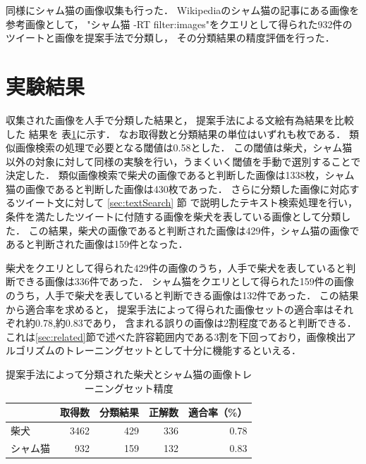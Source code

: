 同様にシャム猫の画像収集も行った．
Wikipediaのシャム猫の記事にある画像を参考画像として，
"シャム猫 -RT filter:images"をクエリとして得られた932件のツイートと画像を提案手法で分類し，
その分類結果の精度評価を行った．

\section{実験結果}
\label{sec:expresult}

収集された画像を人手で分類した結果と，
提案手法による文絵有為結果を比較した
結果を
表\ref{tab:result-shiba}に示す．
なお取得数と分類結果の単位はいずれも枚である．
%
類似画像検索の処理で必要となる閾値は0.58とした．
この閾値は柴犬，シャム猫以外の対象に対して同様の実験を行い，うまくいく閾値を手動で選別することで決定した．
類似画像検索で柴犬の画像であると判断した画像は1338枚，シャム猫の画像であると判断した画像は430枚であった．
%
さらに分類した画像に対応するツイート文に対して
\ref{sec:textSearch}
節
で説明したテキスト検索処理を行い，
条件を満たしたツイートに付随する画像を柴犬を表している画像として分類した．
この結果，柴犬の画像であると判断された画像は429件，シャム猫の画像であると判断された画像は159件となった．


柴犬をクエリとして得られた429件の画像のうち，人手で柴犬を表していると判断できる画像は336件であった．
シャム猫をクエリとして得られた159件の画像のうち，人手で柴犬を表していると判断できる画像は132件であった．
この結果から適合率を求めると，
提案手法によって得られた画像セットの適合率はそれぞれ約0.78,約0.83であり，
含まれる誤りの画像は2割程度であると判断できる．
これは\ref{sec:related}節で述べた許容範囲内である3割を下回っており，画像検出アルゴリズムのトレーニングセットとして十分に機能するといえる．


\begin{table}[tb]
\begin{center}
\caption{提案手法によって分類された柴犬とシャム猫の画像トレーニングセット精度}
\label{tab:result-shiba}
\begin{tabular}{|l|r|r|r|r|}\hline
& 取得数& 分類結果& 正解数& 適合率（\%） \\ \hline \hline

柴犬& 3462& 429& 336& 0.78 \\ \hline
シャム猫& 932& 159& 132& 0.83 \\ \hline
\end{tabular}
\end{center}
\end{table}

